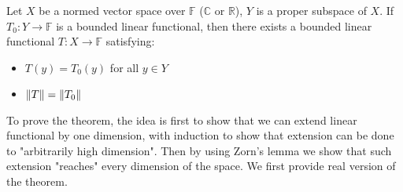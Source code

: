 \begin{theorem}\rm\nextline
	Let $X$ be a normed vector space over $\mathbb F$ ($\mathbb{C}$ or $\mathbb{R}$), $Y$ is a proper subspace of $X$. If $T_0:Y\xrightarrow{}\mathbb{F}$ is a bounded linear functional, then there exists a bounded linear functional $T:X\xrightarrow{}\mathbb{F}$ satisfying:
	\begin{itemize}
		\item $T(y)=T_0(y)$ for all $y\in Y$
		\item $\left\|{T}\right\|=\left\|{T_0}\right\|$
	\end{itemize}
\end{theorem}
To prove the theorem, the idea is first to show that we can extend linear functional by one dimension, with induction to show that extension can be done to "arbitrarily high dimension". Then by using Zorn's lemma we show that such extension "reaches" every dimension of the space. We first provide real version of the theorem.

